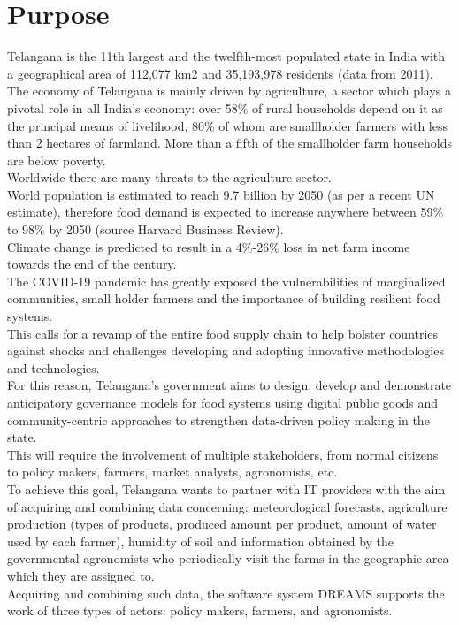 \section{Purpose}

Telangana is the 11th largest and the twelfth-most populated state in India with a geographical area of 112,077 km2 and 35,193,978 residents (data from 2011).\\

The economy of Telangana is mainly driven by agriculture, a sector which plays a pivotal role in all India’s economy: over 58\% of rural households depend on it as the principal means of livelihood, 80\% of whom are smallholder farmers with less than 2 hectares of farmland. More than a fifth of the smallholder farm households are below poverty.\\

Worldwide there are many threats to the agriculture sector.\\
World population is estimated to reach 9.7 billion by 2050 (as per a recent UN estimate), therefore food demand is expected to increase anywhere between 59\% to 98\% by 2050 (source Harvard Business Review).\\
Climate change is predicted to result in a 4\%-26\% loss in net farm income towards the end of the century.\\
The COVID-19 pandemic has greatly exposed the vulnerabilities of marginalized communities, small holder farmers and the importance of building resilient food systems.\\

This calls for a revamp of the entire food supply chain to help bolster countries against shocks and challenges developing and adopting innovative methodologies and technologies.\\
For this reason, Telangana’s government aims to design, develop and demonstrate anticipatory governance models for food systems using digital public goods and community-centric approaches to strengthen data-driven policy making in the state.\\
This will require the involvement of multiple stakeholders, from normal citizens to policy makers, farmers, market analysts, agronomists, etc.\\

To achieve this goal, Telangana wants to partner with IT providers with the aim of acquiring and combining data concerning: meteorological forecasts, agriculture production (types of products, produced amount per product, amount of water used by each farmer), humidity of soil and information obtained by the governmental agronomists who periodically visit the farms in the geographic area which they are assigned to.\\
Acquiring and combining such data, the software system DREAMS supports the work of three types of actors: policy makers, farmers, and agronomists.\\

